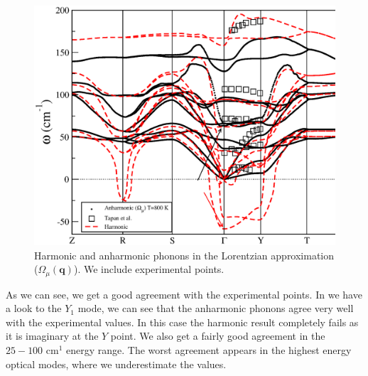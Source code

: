 \begin{figure}[h]
\includegraphics[width=\linewidth]{Figures/exp-vs-theory.eps}
\caption[Comparison of phonons in the Lorentzian approximation and INS experiments.]{Harmonic and anharmonic phonons in the Lorentzian approximation ($\Omega_{\mu}(\mathbf{q})$). We include experimental points\cite{chatterji2018soft}.}
\label{phonon-exp}
\end{figure}
As we can see, we get a good agreement with the experimental points. In we have a look to the $Y_{1}$ mode, we can see that the anharmonic phonons agree very well with the experimental values. In this case the harmonic result completely fails as it is imaginary at the $Y$ point. We also get a fairly good agreement in the $25-100$ cm$^{1}$ energy range. The worst agreement appears in the highest energy optical modes, where we underestimate the values. \\

